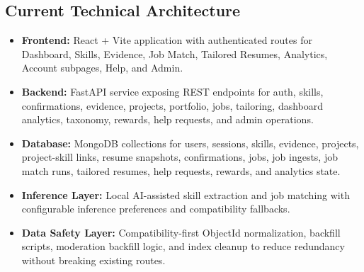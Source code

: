 \documentclass[11pt]{article}
\begin{document}
\subsection*{Current Technical Architecture}
\begin{itemize}
  \item \textbf{Frontend:} React + Vite application with authenticated routes for Dashboard, Skills, Evidence, Job Match, Tailored Resumes, Analytics, Account subpages, Help, and Admin.
  \item \textbf{Backend:} FastAPI service exposing REST endpoints for auth, skills, confirmations, evidence, projects, portfolio, jobs, tailoring, dashboard analytics, taxonomy, rewards, help requests, and admin operations.
  \item \textbf{Database:} MongoDB collections for users, sessions, skills, evidence, projects, project-skill links, resume snapshots, confirmations, jobs, job ingests, job match runs, tailored resumes, help requests, rewards, and analytics state.
  \item \textbf{Inference Layer:} Local AI-assisted skill extraction and job matching with configurable inference preferences and compatibility fallbacks.
  \item \textbf{Data Safety Layer:} Compatibility-first ObjectId normalization, backfill scripts, moderation backfill logic, and index cleanup to reduce redundancy without breaking existing routes.
\end{itemize}
\end{document}
